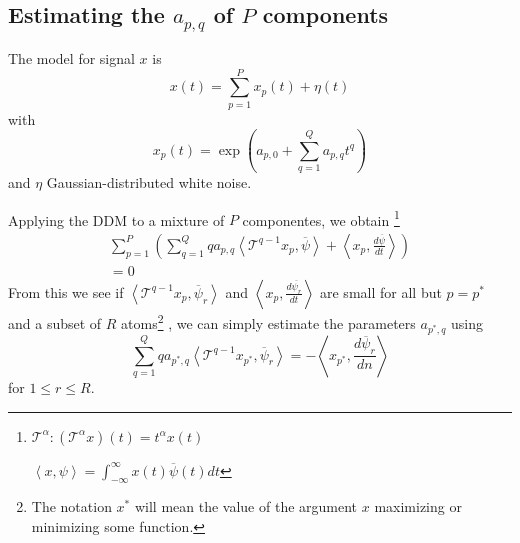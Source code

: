 \documentclass[plainsections,landscape]{sciposter}
\begin{document}
\begin{multicols}{3}
\section{Estimating the \lowercase{$a_{p,q}$} of $P$ components}
\begin{tcolorbox}
    \begin{multicols}{2}
The model for signal $x$ is
%
\begin{equation}
    x(t) = \sum_{p=1}^{P} x_{p}(t) + \eta(t)
\end{equation}
%
with
%
\begin{equation}
    \label{eq:polyphaseexpmix}
    x_{p}(t) = \exp(a_{p,0} + \sum_{q=1}^{Q} a_{p,q} t^q)
\end{equation}
%
and $\eta$ Gaussian-distributed white noise. 
    \end{multicols}
\end{tcolorbox}

\begin{tcolorbox}
\begin{multicols}{2}
Applying the DDM to a mixture of $P$ componentes, we obtain%
\footnote{
$\mathcal{T}^{\alpha} : (\mathcal{T}^{\alpha}x)(t) = t^{\alpha}x(t)$

$\left\langle x , \psi \right\rangle = 
\int_{-\infty}^{\infty}x(t)\overline{\psi}(t)dt$
}
%
\begin{multline}
    \label{eq:mixest}
    \sum_{p=1}^{P} \left(
    \sum_{q=1}^{Q} q a_{p,q} 
    \left\langle \mathcal{T}^{q-1} x_{p} , \overline{\psi} \right\rangle
    + \left\langle x_{p}, \frac{d\overline{\psi}}{dt} \right\rangle \right)
    \\
    = 0
\end{multline}
%
From this we see if $\left\langle \mathcal{T}^{q-1} x_{p} , \overline{\psi}_{r}
\right\rangle$ and $\left\langle x_{p}, \frac{d\overline{\psi_{r}}}{dt} \right\rangle$
are small for all but $p = p^{\ast}$ and a subset of $R$ atoms\footnote{%
The notation $x^{\ast}$ will mean the value of the argument $x$ maximizing or minimizing some
function.
}%
, we can simply estimate the parameters $a_{p^{\ast},q}$ using
\begin{equation}
    \sum_{q=1}^{Q} q a_{{p^{\ast}},q} 
    \left\langle \mathcal{T}^{q-1} x_{p^{\ast}} , \overline{\psi}_{r} \right\rangle
    = -\left\langle x_{p^{\ast}}, \frac{d\overline{\psi}_{r}}{dn} \right\rangle
\end{equation}
for $1 \leq r \leq R$.
\end{multicols}
\end{tcolorbox}


\end{multicols}
\end{document}
